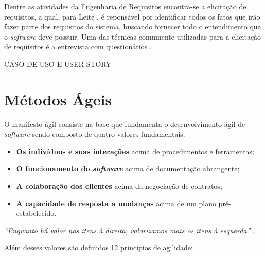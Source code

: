     Dentre as atividades da Engenharia de Requisitos encontra-se a elicitação de requisitos, a qual, para Leite \cite{leite_1994}, é reponsável por identificar todos os fatos que irão fazer parte dos requisitos do sistema, buscando fornecer todo o entendimento que o \textit{software} deve possuir. Uma das técnicas comumente utilizadas para a elicitação de requisitos é a entrevista com questionários \cite{goguen_1994}.

    CASO DE USO E USER STORY

\section{Métodos Ágeis}
O manifesto ágil \cite{beck2001agile} consiste na base que fundamenta o desenvolvimento ágil de
\textit{software} sendo composto de quatro valores fundamentais:

\begin{itemize}
    \item \textbf{Os indivíduos e suas interações} acima de procedimentos e ferramentas;
    \item \textbf{O funcionamento do \textit{software}} acima de documentação abrangente;
    \item \textbf{A colaboração dos clientes} acima da negociação de contratos;
    \item \textbf{A capacidade de resposta a mudanças} acima de um plano pré-estabelecido.
\end{itemize}

\textit{``Enquanto há valor nos itens à direita, valorizamos mais os itens à esquerda''} \cite{beck2001agile}.

Além desses valores são definidos 12 princípios de agilidade:

